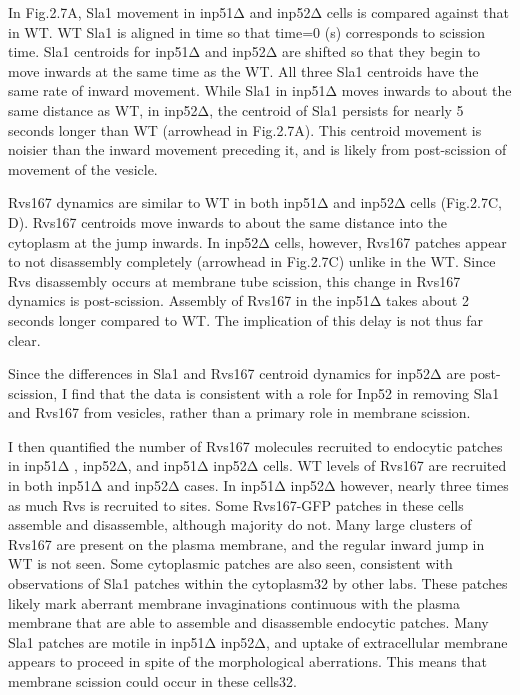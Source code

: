 In Fig.2.7A, Sla1 movement in inp51Δ and inp52Δ cells is compared against that in WT. WT Sla1 is aligned in time so that time=0 (s) corresponds to scission time. Sla1 centroids for inp51Δ and inp52Δ are shifted so that they begin to move inwards at the same time as the WT. All three Sla1 centroids have the same rate of inward movement. While Sla1 in inp51Δ moves inwards to about the same distance as WT, in inp52Δ, the centroid of Sla1 persists for nearly 5 seconds longer than WT (arrowhead in Fig.2.7A). This centroid movement is noisier than the inward movement preceding it, and is likely from post-scission of movement of the vesicle. 
	\vspace{5mm}
	
Rvs167 dynamics are similar to WT in both inp51Δ and inp52Δ cells (Fig.2.7C, D). Rvs167 centroids move inwards to about the same distance into the cytoplasm at the jump inwards. In inp52Δ cells, however, Rvs167 patches appear to not disassembly completely (arrowhead in Fig.2.7C) unlike in the WT. Since Rvs disassembly occurs at membrane tube scission, this change in Rvs167 dynamics is post-scission. Assembly of Rvs167 in the inp51Δ takes about 2 seconds longer compared to WT. The implication of this delay is not thus far clear. 
	\vspace{5mm}

Since the differences in Sla1 and Rvs167 centroid dynamics for inp52Δ are post-scission, I find that the data is consistent with a role for Inp52 in removing Sla1 and Rvs167 from vesicles, rather than a primary role in membrane scission. 

\vspace{5mm}


I then quantified the number of Rvs167 molecules recruited to endocytic patches in inp51Δ , inp52Δ, and inp51Δ inp52Δ cells.  WT levels of Rvs167 are recruited in both inp51Δ and inp52Δ cases. In inp51Δ inp52Δ however, nearly three times as much Rvs is recruited to sites. Some Rvs167-GFP patches in these cells assemble and disassemble, although majority do not. Many large clusters of Rvs167 are present on the plasma membrane, and the regular inward jump in WT is not seen. Some cytoplasmic patches are also seen, consistent with observations of Sla1 patches within the cytoplasm32 by other labs. These patches likely mark aberrant membrane invaginations continuous with the plasma membrane that are able to assemble and disassemble endocytic patches. Many Sla1 patches are motile in inp51Δ inp52Δ, and uptake of extracellular membrane appears to proceed in spite of the morphological aberrations. This means that membrane scission could occur in these cells32. 

